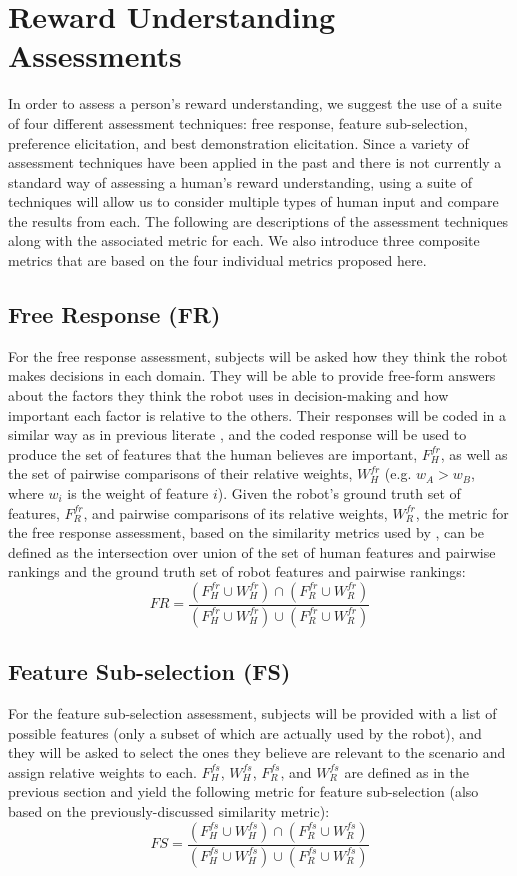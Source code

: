 \documentclass[letterpaper]{article} %
\begin{document}
\section{Reward Understanding Assessments}

In order to assess a person's reward understanding, we suggest the use of a suite of four different assessment techniques: free response, feature sub-selection, preference elicitation, and best demonstration elicitation. Since a variety of assessment techniques have been applied in the past and there is not currently a standard way of assessing a human's reward understanding, using a suite of techniques will allow us to consider multiple types of human input and compare the results from each. The following are descriptions of the assessment techniques along with the associated metric for each. We also introduce three composite metrics that are based on the four individual metrics proposed here.

\subsection{Free Response (FR)}
For the free response assessment, subjects will be asked how they think the robot makes decisions in each domain. They will be able to provide free-form answers about the factors they think the robot uses in decision-making and how important each factor is relative to the others. Their responses will be coded in a similar way as in previous literate \cite{anderson2019explaining, kim2017collaborative, hoffman2018metrics}, and
the coded response will be used to produce the set of features that the human believes are important, $F_H^{fr}$, as well as the set of pairwise comparisons of their relative weights, $W_H^{fr}$ (e.g. $w_A > w_B$, where $w_i$ is the weight of feature $i$). Given the robot's ground truth set of features, $F_R^{fr}$, and pairwise comparisons of its relative weights, $W_R^{fr}$, the metric for the free response assessment, based on the similarity metrics used by \citet{shah2020interactive}, can be defined as the intersection over union of the set of human features and pairwise rankings and the ground truth set of robot features and pairwise rankings: \[FR = \dfrac{(F_H^{fr} \cup W_H^{fr}) \cap (F_R^{fr} \cup W_R^{fr})}{(F_H^{fr} \cup W_H^{fr}) \cup (F_R^{fr} \cup W_R^{fr})}\]

\subsection{Feature Sub-selection (FS)}
For the feature  sub-selection  assessment,  subjects  will be provided  with a list of possible features (only a subset of which are actually used by the robot), and they will be asked to select the ones they believe are relevant to the scenario and assign relative weights to each. $F_H^{fs}$, $W_H^{fs}$, $F_R^{fs}$, and $W_R^{fs}$ are defined as in the previous section and yield the following metric for feature sub-selection (also based on the previously-discussed similarity metric): \[FS = \dfrac{(F_H^{fs} \cup W_H^{fs}) \cap (F_R^{fs} \cup W_R^{fs})}{(F_H^{fs} \cup W_H^{fs}) \cup (F_R^{fs} \cup W_R^{fs})}\]
\end{document}
